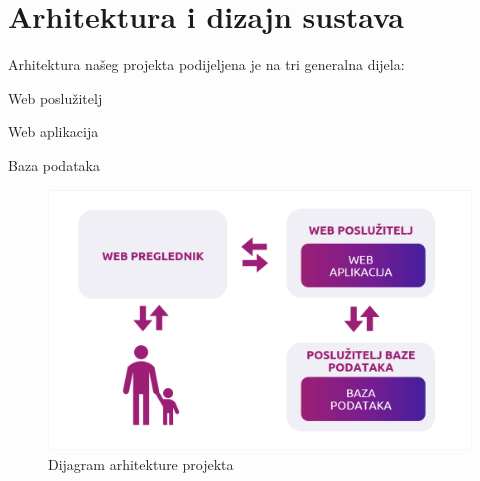 \chapter{Arhitektura i dizajn sustava}
		
		\text	Arhitektura našeg projekta podijeljena je na tri generalna dijela:
		\begin{packed_item}
			\item Web poslužitelj
			\item Web aplikacija
			\item Baza podataka
		\end{packed_item}
		
		\begin{figure}[H]
			\includegraphics[scale=0.4]{slike/graf1b.PNG} %
			\centering
			\caption{Dijagram arhitekture projekta}
			\label{fig:arhitektura-sustava}
		\end{figure}
		
